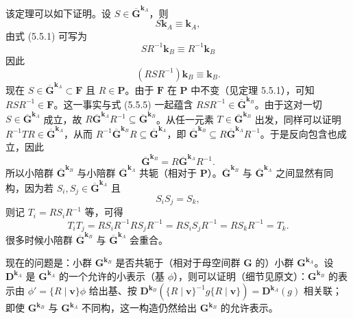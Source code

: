 该定理可以如下证明。设 $S \in \overline{\mathbf{G}}^{\mathbf{k}_{A}}$，则
\begin{equation*}
S\mathbf{k}_{A} \equiv \mathbf{k}_{A},
\tag{5.5.3}
\end{equation*}
由式 (5.5.1) 可写为
\begin{equation*}
SR^{-1}\mathbf{k}_{B} \equiv R^{-1}\mathbf{k}_{B}
\tag{5.5.4}
\end{equation*}
因此
\begin{equation*}
(RSR^{-1})\mathbf{k}_{B} \equiv \mathbf{k}_{B}.
\tag{5.5.5}
\end{equation*}
现在 $S \in \overline{\mathbf{G}}^{\mathbf{k}_{A}} \subset \mathbf{F}$ 且 $R \in \mathbf{P}$。由于 $\mathbf{F}$ 在 $\mathbf{P}$ 中不变（见定理 5.5.1），可知 $RSR^{-1} \in \mathbf{F}$。这一事实与式 (5.5.5) 一起蕴含 $RSR^{-1} \in \overline{\mathbf{G}}^{\mathbf{k}_{B}}$。由于这对一切 $S \in \overline{\mathbf{G}}^{\mathbf{k}_{A}}$ 成立，故 $R\overline{\mathbf{G}}^{\mathbf{k}_{A}}R^{-1} \subseteq \overline{\mathbf{G}}^{\mathbf{k}_{B}}$。从任一元素 $T \in \overline{\mathbf{G}}^{\mathbf{k}_{B}}$ 出发，同样可以证明 $R^{-1}TR \in \overline{\mathbf{G}}^{\mathbf{k}_{A}}$，从而 $R^{-1}\overline{\mathbf{G}}^{\mathbf{k}_{B}}R \subseteq \overline{\mathbf{G}}^{\mathbf{k}_{A}}$，即 $\overline{\mathbf{G}}^{\mathbf{k}_{B}} \subseteq R\overline{\mathbf{G}}^{\mathbf{k}_{A}}R^{-1}$。于是反向包含也成立，因此
\begin{equation*}
\overline{\mathbf{G}}^{\mathbf{k}_{B}} = R\overline{\mathbf{G}}^{\mathbf{k}_{A}}R^{-1}.
\tag{5.5.6}
\end{equation*}
所以小陪群 $\overline{\mathbf{G}}^{\mathbf{k}_{B}}$ 与小陪群 $\overline{\mathbf{G}}^{\mathbf{k}_{A}}$ 共轭（相对于 $\mathbf{P}$）。$\overline{\mathbf{G}}^{\mathbf{k}_{B}}$ 与 $\overline{\mathbf{G}}^{\mathbf{k}_{A}}$ 之间显然有同构，因为若 $S_{i}, S_{j} \in \overline{\mathbf{G}}^{\mathbf{k}_{A}}$ 且
\begin{equation*}
S_{i}S_{j} = S_{k},
\tag{5.5.7}
\end{equation*}
则记 $T_{i} = RS_{i}R^{-1}$ 等，可得
\begin{equation*}
T_{i}T_{j} = RS_{i}R^{-1}RS_{j}R^{-1} = RS_{i}S_{j}R^{-1} = RS_{k}R^{-1} = T_{k}.
\tag{5.5.8}
\end{equation*}
很多时候小陪群 $\overline{\mathbf{G}}^{\mathbf{k}_{B}}$ 与 $\overline{\mathbf{G}}^{\mathbf{k}_{A}}$ 会重合。

现在的问题是：小群 $\mathbf{G}^{\mathbf{k}_{B}}$ 是否共轭于（相对于母空间群 $\mathbf{G}$ 的）小群 $\mathbf{G}^{\mathbf{k}_{A}}$。设 $\mathbf{D}^{\mathbf{k}_{A}}$ 是 $\mathbf{G}^{\mathbf{k}_{A}}$ 的一个允许的小表示（基 $\phi$），则可以证明（细节见原文）：$\mathbf{G}^{\mathbf{k}_{B}}$ 的表示由 $\phi' = \{R \mid \mathbf{v}\}\phi$ 给出基、按 $\mathbf{D}^{\mathbf{k}_{B}}(\{R \mid \mathbf{v}\}^{-1}g\{R \mid \mathbf{v}\}) = \mathbf{D}^{\mathbf{k}_{A}}(g)$ 相关联；即使 $\mathbf{G}^{\mathbf{k}_{B}}$ 与 $\mathbf{G}^{\mathbf{k}_{A}}$ 不同构，这一构造仍然给出 $\mathbf{G}^{\mathbf{k}_{B}}$ 的允许表示。

